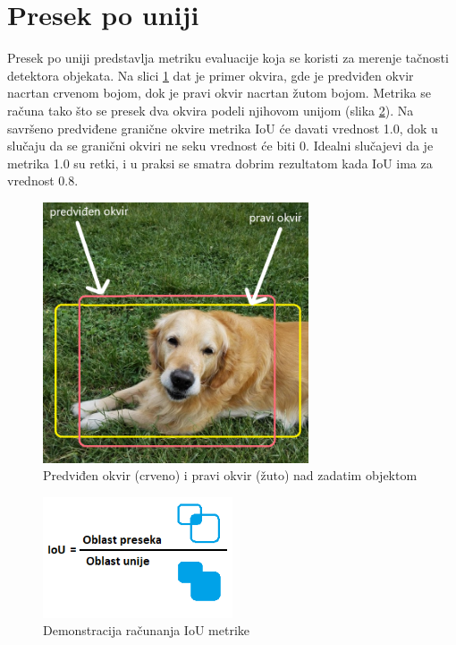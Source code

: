 \documentclass[12pt,oneside]{memoir}
\begin{document}
\section{Presek po uniji}
Presek po uniji predstavlja metriku evaluacije koja se koristi za merenje tačnosti detektora objekata. Na slici \ref{fig:section3_iou} dat je primer okvira, gde je predviđen okvir nacrtan crvenom bojom, dok je pravi okvir nacrtan žutom bojom. Metrika se računa tako što se presek dva okvira podeli njihovom unijom (slika \ref{fig:section3_iou_calc}). Na savršeno predviđene granične okvire metrika IoU će davati vrednost 1.0, dok u slučaju da se granični okviri ne seku vrednost će biti 0. Idealni slučajevi da je metrika 1.0 su retki, i u praksi se smatra dobrim rezultatom kada IoU ima za vrednost 0.8.

\begin{figure}[!ht]
    \centering
    \includegraphics[width=0.7\textwidth]{matfmaster/glava3/iou_cus.png}
    \caption{Predviđen okvir (crveno) i pravi okvir (žuto) nad zadatim objektom}
    \label{fig:section3_iou}
\end{figure}

\begin{figure}[!ht]
    \centering
    \includegraphics[width=0.5\textwidth]{matfmaster/glava3/iou_calc_cus.png}
    \caption{Demonstracija računanja IoU metrike}
    \label{fig:section3_iou_calc}
\end{figure}
\end{document}
